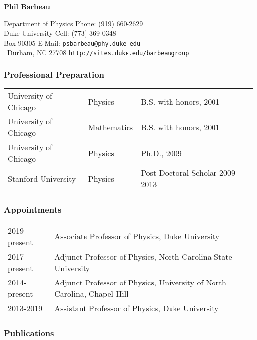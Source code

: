 \documentclass[12pt]{article}
\begin{document}
\begin{center}
{\Large \bf Phil Barbeau}
\end{center}


\noindent
Department of Physics \hfill Phone: (919) 660-2629\\
Duke University \hfill Cell: (773) 369-0348\\
Box 90305 \hfill E-Mail: {\tt psbarbeau@phy.duke.edu}\\\
Durham, NC 27708 \hfill  {\tt http://sites.duke.edu/barbeaugroup}\


\vspace{-0.2in}
\subsubsection*{Professional Preparation}
\begin{tabular}[t]{lll}
University of Chicago & Physics & B.S. with honors, 2001  \\
University of Chicago & Mathematics & B.S. with honors, 2001  \\
University of Chicago & Physics  & Ph.D., 2009  \\
Stanford University & Physics & Post-Doctoral Scholar 2009-2013\\

\end{tabular}

\vspace{-0.1in}

\subsubsection*{Appointments}
\begin{tabular}[t]{ll}
2019-present & Associate Professor of Physics, Duke University\\
2017-present & Adjunct Professor of Physics, North Carolina State University \\
2014-present & Adjunct Professor of Physics, University of North Carolina, Chapel Hill  \\
2013-2019 & Assistant Professor of Physics, Duke University  \\
\end{tabular}



\vspace{-0.1in}
\subsubsection*{Publications}
\end{document}
